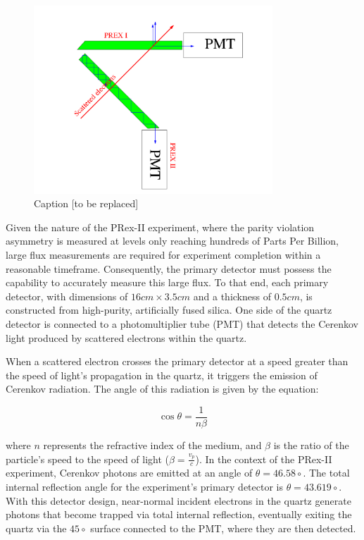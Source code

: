 \begin{figure}[!htbp]
\centering
\includegraphics[width=0.8\textwidth]{images/chap3/quartz_light.png}
\caption{Caption [to be replaced]}
\label{fig:enter-label}
\end{figure}

Given the nature of the PRex-II experiment, where the parity violation asymmetry is measured at levels only reaching hundreds of Parts Per Billion, large flux measurements are required for experiment completion within a reasonable timeframe. Consequently, the primary detector must possess the capability to accurately measure this large flux. To that end, each primary detector, with dimensions of $16cm \times 3.5cm$ and a thickness of $0.5cm$, is constructed from high-purity, artificially fused silica. One side of the quartz detector is connected to a photomultiplier tube (PMT) that detects the Cerenkov light produced by scattered electrons within the quartz.

When a scattered electron crosses the primary detector at a speed greater than the speed of light's propagation in the quartz, it triggers the emission of Cerenkov radiation. The angle of this radiation is given by the equation:

\begin{equation}
\cos{\theta} = \frac{1}{n\beta}
\end{equation}

where $n$ represents the refractive index of the medium, and $\beta$ is the ratio of the particle's speed to the speed of light ($\beta = \frac{v_p}{c}$). In the context of the PRex-II experiment, Cerenkov photons are emitted at an angle of $\theta = 46.58\circ$. The total internal reflection angle for the experiment's primary detector is $\theta = 43.619\circ$. With this detector design, near-normal incident electrons in the quartz generate photons that become trapped via total internal reflection, eventually exiting the quartz via the $45\circ$ surface connected to the PMT, where they are then detected.

